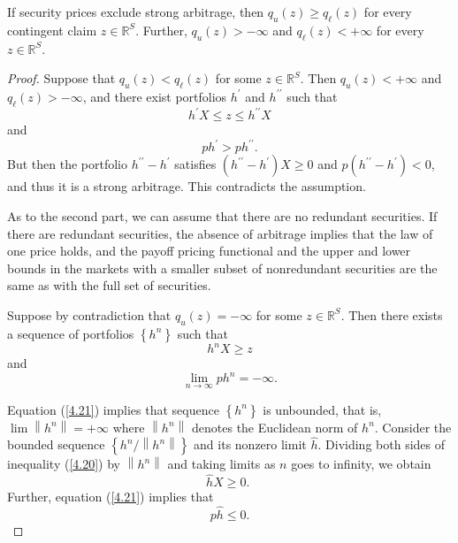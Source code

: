 \documentclass[\topdir/lecture\_notes.tex]{subfiles}
\begin{document}
\begin{optional}
\begin{proposition} \label{prop:bounds_ordering}
If security prices exclude strong arbitrage, then $q_{u}(z) \geq q_{\ell}(z)$ for every contingent claim $z \in \mathbb{R}^{S}$. Further, $q_{u}(z)>-\infty$ and $q_{\ell}(z)<+\infty$ for every $z \in \mathbb{R}^{S}$.
\end{proposition}
\begin{proof}
Suppose that $q_{u}(z)<q_{\ell}(z)$ for some $z \in \mathbb{R}^{S}$. Then $q_{u}(z)<+\infty$ and $q_{\ell}(z)>-\infty$, and there exist portfolios $h^{\prime}$ and $h^{\prime \prime}$ such that
\begin{equation*}
h^{\prime} X \leq z \leq h^{\prime \prime} X 
\end{equation*}
and
\begin{equation*}
p h^{\prime}>p h^{\prime \prime} . 
\end{equation*}
But then the portfolio $h^{\prime \prime}-h^{\prime}$ satisfies $\left(h^{\prime \prime}-h^{\prime}\right) X \geq 0$ and $p\left(h^{\prime \prime}-h^{\prime}\right)<0$, and thus it is a strong arbitrage. This contradicts the assumption.

As to the second part, we can assume that there are no redundant securities. If there are redundant securities, the absence of arbitrage implies that the law of one price holds, and the payoff pricing functional and the upper and lower bounds in the markets with a smaller subset of nonredundant securities are the same as with the full set of securities.

Suppose by contradiction that $q_{u}(z)=-\infty$ for some $z \in \mathbb{R}^{S}$. Then there exists a sequence of portfolios $\left\{h^{n}\right\}$ such that
\begin{equation}
h^{n} X \geq z \label{4.20}
\end{equation}
and
\begin{equation}
\lim _{n \rightarrow \infty} p h^{n}=-\infty . \label{4.21}
\end{equation}

Equation (\ref{4.21}) implies that sequence $\left\{h^{n}\right\}$ is unbounded, that is, $\lim \left\|h^{n}\right\|=+\infty$ where $\left\|h^{n}\right\|$ denotes the Euclidean norm of $h^{n}$. Consider the bounded sequence $\left\{h^{n} /\left\|h^{n}\right\|\right\}$ and its nonzero limit $\hat{h}$. Dividing both sides of inequality (\ref{4.20}) by $\left\|h^{n}\right\|$ and taking limits as $n$ goes to infinity, we obtain
\begin{equation}
\hat{h} X \geq 0 \text {. } \label{4.22}
\end{equation}
Further, equation (\ref{4.21}) implies that
\begin{equation}
p \hat{h} \leq 0 . \label{4.23}
\end{equation}


\end{proof}
\end{optional}
\end{document}
